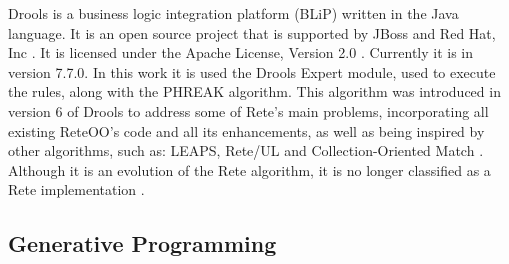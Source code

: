 Drools is a business logic integration platform (BLiP) written in the Java language. It is an open source project that is supported by JBoss and Red Hat, Inc \cite{bali2009}. It is licensed under the Apache License, Version 2.0 \cite{browne2009}. Currently it is in version 7.7.0. In this work it is used the Drools Expert module, used to execute the rules, along with the PHREAK algorithm. This algorithm was introduced in version 6 of Drools to address some of Rete's main problems, incorporating all existing ReteOO's code and all its enhancements, as well as being inspired by other algorithms, such as: LEAPS, Rete/UL \cite{doorenbos1995} and Collection-Oriented Match \cite{acharya1993}. Although it is an evolution of the Rete algorithm, it is no longer classified as a Rete implementation \cite{drools2017}.

\subsection{Generative Programming}




